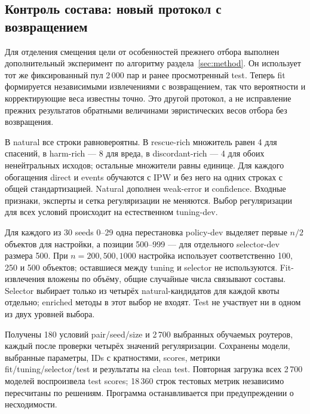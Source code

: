 \subsection{Контроль состава: новый протокол с возвращением}
Для отделения смещения цели от особенностей прежнего отбора выполнен
дополнительный эксперимент по алгоритму раздела~\ref{sec:method}.
Он использует тот же фиксированный пул 2\,000 пар и ранее просмотренный
test. Теперь fit формируется независимыми извлечениями с возвращением,
так что вероятности и корректирующие веса известны точно.
Это другой протокол, а не исправление прежних результатов
обратными величинами эвристических весов отбора без возвращения.

В natural все строки равновероятны. В rescue-rich множитель равен 4
для спасений, в harm-rich --- 8 для вреда, в discordant-rich --- 4
для обоих ненейтральных исходов; остальные множители равны единице.
Для каждого обогащения direct и events обучаются с IPW и без него
на одних строках с общей стандартизацией. Natural дополнен
weak-error и confidence. Входные признаки, эксперты и сетка
регуляризации не меняются. Выбор регуляризации для всех условий
происходит на естественном tuning-dev.

Для каждого из 30 seeds 0--29 одна перестановка policy-dev выделяет
первые $n/2$ объектов для настройки, а позиции 500--999 ---
для отдельного selector-dev размера 500. При $n=200,500,1000$
настройка использует соответственно 100, 250 и 500 объектов;
оставшиеся между tuning и selector не используются. Fit-извлечения
вложены по объёму, общие случайные числа связывают составы.
Selector выбирает только из четырёх natural-кандидатов для каждой
квоты отдельно; enriched методы в этот выбор не входят.
Test не участвует ни в одном из двух уровней выбора.

Получены 180 условий pair/seed/size и 2\,700 выбранных обучаемых
роутеров, каждый после проверки четырёх значений регуляризации.
Сохранены модели, выбранные параметры, IDs с кратностями, scores,
метрики fit/tuning/selector/test и результаты на clean test.
Повторная загрузка всех 2\,700 моделей воспроизвела test scores;
18\,360 строк тестовых метрик независимо пересчитаны по решениям.
Программа останавливается при предупреждении о несходимости.

